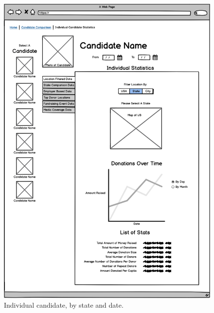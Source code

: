 \documentclass[12pt]{article}
\begin{document}
    \begin{figure}[H]
        \begin{center}
        \includegraphics[scale=.30]{candidatefilterstateday}
        \caption{Individual candidate, by state and date.}
        \label{fig:7}
        \end{center}
    \end{figure}
    
\end{document}
